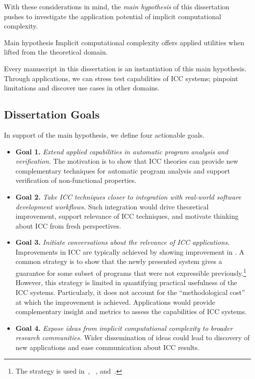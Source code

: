 With these considerations in mind, the \emph{main hypothesis} of this
dissertation pushes to investigate the application potential of implicit
computational complexity.

\begin{infobox}[]{Main hypothesis}
Implicit computational complexity offers applied utilities when lifted from the
theoretical domain.
\end{infobox}

\noindent
Every manuscript in this dissertation is an instantiation of this main
hypothesis. Through applications, we can stress test capabilities of ICC
systems; pinpoint limitations and discover use cases in other domains.

\subsection{Dissertation Goals}\label{subsec:specific-aims}

In support of the main hypothesis, we define four actionable goals.

\begin{itemize}[label=\iconBOX]

\item\textbf{Goal 1.}
\emph{Extend applied capabilities in automatic program analysis and
verification.}
The motivation is to show that ICC theories can provide new complementary
techniques for automatic program analysis and support verification of
non-functional properties.

\item\textbf{Goal 2.}
\emph{Take ICC techniques closer to integration with real-world software
development workflows.}
Such integration would drive theoretical improvement, support relevance of ICC
techniques, and motivate thinking about ICC from fresh perspectives.

\item\textbf{Goal 3.}
\emph{Initiate conversations about the relevance of ICC applications.}
Improvements in ICC are typically achieved by showing improvement in
. A common strategy is to show that the newly presented
system gives a guarantee for some subset of programs that were not expressible
previously.\footnote{The strategy is used \eg in~\cite[p.16--17]{hainry2023},
~\cite[p. 17]{jones2009}, and~\cite[p. 147]{feree2018}.} However, this strategy
is limited in quantifying practical usefulness of the ICC systems. Particularly,
it does not account for the \enquote{methodological cost} at which the
improvement is achieved. Applications would provide complementary insight and
metrics to assess the capabilities of ICC systems.

\item\textbf{Goal 4.}
\emph{Expose ideas from implicit computational complexity to broader research
communities.}
Wider dissemination of ideas could lead to discovery of new applications and
ease communication about ICC results.

\end{itemize}

